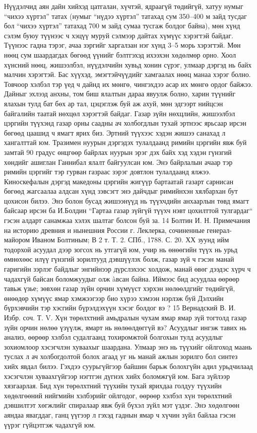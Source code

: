 Нүүдэлчид аян дайн хийхэд цатгалан, хүчтэй, ядраагүй төдийгүй, хатуу нумыг “чихээ хүртэл” татах (нумыг “нүдээ хүртэл” татахад сум 350–400 м зайд тусдаг бол “чихээ хүртэл” татахад 700 м зайд сумаа тусгаж болдог байна), мөн хүнд сэлэм буюу түүнээс ч хэцүү муруй сэлмээр дайтах хүмүүс хэрэгтэй байдаг. Түүнээс гадна тэрэг, ачаа зэргийг харгалзан нэг хүнд 3–5 морь хэрэгтэй. Мөн нөөц сум шаардагдах бөгөөд үүнийг бэлтгэхэд ихээхэн хөдөлмөр орно. Хоол хүнсний нөөц, жишээлбэл, нүүдэлчийн хувьд хонин сүрэг, улмаар дэргэд нь байх малчин хэрэгтэй. Бас хүүхэд, эмэгтэйчүүдийг хамгаалах нөөц манаа хэрэг болно. Товчоор хэлбэл тэр үед ч дайнд их мөнгө, чингэхдээ асар их мөнгө ордог байжээ. Дайныг эхлээд анхны, том биш ялалтын дараа явуулж болно, харин түүнийг ялахын тулд бат бөх ар тал, цэцэглэж буй аж ахуй, мөн эдгээрт нийцсэн байгалийн таатай нөхцөл хэрэгтэй байдаг.
Газар зүйн нөхцлийн, жишээлбэл цэргийн түүхэнд газар орны саадны ач холбогдлын тухай эртнээс ярьсаар ирсэн бөгөөд цаашид ч ямагт ярих биз. Эртний түүхээс хэдэн жишээ санахад л хангалттай юм. Тразимен нуурын дэргэдэх тулалдаанд римийн цэргийн явж буй замтай 90 градус өнцгөөр байрлах нуурын эрэг дэх байх хэд хэдэн гүнзгий хөндийг ашиглан Ганнибал ялалт байгуулсан юм. Энэ байрлалын ачаар тэр римийн цэргийг тэр гурван газраас зэрэг довтлон тулалдаанд ялжээ. Киноскефалын дэргэд македоны цэргийн жигүүр бартаатай газарт сарнисан бөгөөд жагсаалаа алдсан хүнд зэвсэгт энэ дайчдыг римийнхэн хялбархан бут цохисон билээ. Энэ болон бусад жишээнүүд нь түүхчдийн анхаарлын төвд ямагт байсаар ирсэн ба И.Болдин “Гартаа газар зүйгүй түүхч нэвт цохилттой тулгардаг“ гэсэн алдарт санамжаа хэлэх шалтаг болсон буй за.
14 Болтин И. Н. Примечания на историю древния и нынешния России г. Леклерка, сочиненные генерал-майором Иваном Болтиным; В 2 т. Т. 2. СПб., 1788. С. 20.
ХХ зуунд ийм тодорхой асуудал дээр зогсох нь утгагүй юм, учир нь өнөөгийн түүх нь урьд өмнөхөөс илүү гүнзгий зорилтууд дэвшүүлэх болж, газар зүй ч гэсэн манай гаригийн зэрлэг байдлыг энгийнээр дүрслэхээс холдож, манай өвөг дээдэс хүрч ч чадахгүй байсан боломжуудыг олж àвсан байна.
Иймээс бид асуудлаа өөрөөр тавьж үзье; зөвхөн газар зүйн орчин хүмүүст хэрхэн нөлөөлдгийг төдийгүй, өнөөдөр хүмүүс ямар хэмжээгээр био хүрээ хэмээн нэрлэж буй Дэлхийн бүрхэвчийн тэр хэсгийн бүрэлдэхүүн хэсэг болдог вэ ?
15 Вернадский В. И. Избр. соч. Т. V.
Хүн төрөлхтний амьдралын чухам ямар ямар зүй тогтолд газар зүйн орчин нөлөө үзүүлж, ямарт нь нөлөөлдөггүй вэ? Асуудлыг ингэж тавих нь анализ, өөрөөр хэлбэл судалгаанд тохиромжтой болгохын тулд асуудлыг зохиомлоор хэсэгчлэн хуваахыг шаардана. Улмаар энэ нь түүхийг ойлгоход маань туслах л ач холбогдолтой болох агаад уг нь манай ажлын зорилго бол синтез хийх явдал билээ. Гэхдээ суурьгүйгээр байшин барьж болохгүйн адил урьдчилаад хэсэгчлэн хуваахгүйгээр нэгтгэн дүгнэх хийх боломжгүй юм. Бага зүйлээр хязгаарлая. Бид хүн төрөлхтний түүхийн тухай ярихдаа голдуу түүхийн хөдөлгөөний нийгмийн хэлбэрийг ойлгодог, өөрөөр хэлбэл хүн төрөлхтний дэвшилтэт хөгжлийг спиралаар явж буй бүхэл зүйл мэт үздэг. Энэ хөдөлгөөн аяндаа явагддаг, ганц үүгээр л гэхэд гаднын ямар ч хүчин зүйл байлаа гэсэн үүрэг гүйцэтгэж чадахгүй юм.
